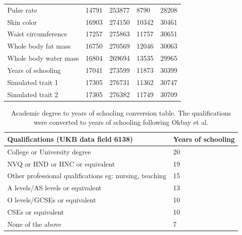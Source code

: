 \documentclass[hidelinks, 12pt]{article}
\begin{document}
\begin{table}[h]
\begin{center}
\begin{tabular}{| l l l l l |}
Pulse rate & 14791 & 253877 & 8790 & 28208 \\
Skin color & 16903 & 274150 & 10342 & 30461 \\
Waist circumference & 17257 & 275863 & 11757 & 30651 \\
Whole body fat mass & 16750 & 270569 & 12046 & 30063 \\
Whole body water mass & 16804 & 269694 & 13535 & 29965 \\
Years of schooling & 17041 & 273599 & 11873 & 30399 \\
   \hline\hline
Simulated trait 1 & 17305 & 276731 & 11362 & 30747 \\
Simulated trait 2 & 17305 & 276382 & 11749 & 30709 \\
   \hline
 \end{tabular}
\end{center}
\end{table}

\pagebreak

\begin{table}[h]
\caption[Academic degree to years of schooling conversion table]{\small Academic degree to years of schooling conversion table. The qualifications were converted to years of schooling following Okbay et al. \cite{okbay2016genome}}
\begin{center}
 \begin{tabular}{| l l |} 
 \hline
 \textbf{Qualifications (UKB data field 6138)} & \textbf{Years of schooling} \\ [0.5ex] 
 \hline\hline
  College or University degree  & 20  \\ 
  NVQ or HND or HNC or equivalent & 19  \\
  Other professional qualifications eg: nursing, teaching  & 15  \\
  A levels/AS levels or equivalent & 13  \\
  O levels/GCSEs or equivalent  & 10  \\
  CSEs or equivalent & 10  \\
  None of the above & 7  \\
   \hline
 \end{tabular}
\end{center}
\end{table}
\pagebreak
\end{document}
